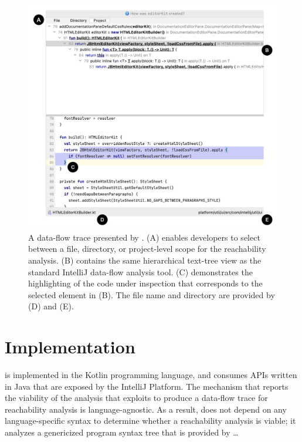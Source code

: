 \begin{figure}[ht]
\centering
\includegraphics[width=\textwidth]{./figs/reach-hover-vis.png}
\caption{
  A data-flow trace presented by \toolname{}. (A) enables developers to select
  between a file, directory, or project-level scope for the reachability
  analysis. (B) contains the same hierarchical text-tree view as the standard
  IntelliJ data-flow analysis tool. (C) demonstrates the highlighting of the
  code under inspection that corresponds to the selected element in (B).
  The file name and directory are provided by (D) and (E).
}
\label{fig:ReachHoverVis}
\end{figure}

\section{Implementation}
\label{sec:Impl}

\toolname{} is implemented in the Kotlin programming language, and consumes
\acp{API} written in Java that are exposed by the IntelliJ Platform.
The mechanism that reports the viability of the analysis that \toolname{}
exploits to produce a data-flow trace for reachability analysis is 
language-agnostic.
As a result, \toolname{} does not depend on any language-specific syntax to 
determine whether a reachability analysis is viable; it analyzes a genericized 
program syntax tree that is provided by  \dots

\endinput
